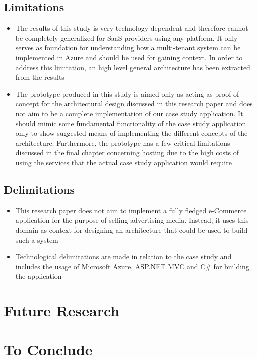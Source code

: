 \subsection{Limitations}
\begin{itemize}
\item The results of this study is very technology dependent and therefore cannot be completely generalized for SaaS providers using any platform. It only serves as foundation for understanding how a multi-tenant system can be implemented in Azure and should be used for gaining context. In order to address this limitation, an high level general architecture has been extracted from the results
\item The prototype produced in this study is aimed only as acting as proof of concept for the architectural design discussed in this research paper and does not aim to be a complete implementation of our case study application. It should mimic some fundamental functionality of the case study application only to show suggested means of implementing the different concepts of the architecture. Furthermore, the prototype has a few critical limitations discussed in the final chapter concerning hosting due to the high costs of using the services that the actual case study application would require
\end{itemize}

\subsection{Delimitations}
\begin{itemize}
\item This research paper does not aim to implement a fully fledged e-Commerce application for the purpose of selling advertising media. Instead, it uses this domain as context for designing an architecture that could be used to build such a system
\item Technological delimitations are made in relation to the case study and includes the usage of Microsoft Azure, ASP.NET MVC and C# for building the application
\end{itemize}

\section{Future Research}

\section{To Conclude}


